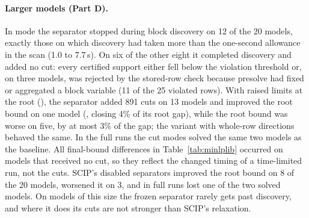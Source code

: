 \paragraph{Larger models (Part D).} In mode  the separator stopped
during block discovery on 12 of the 20 models, exactly those on which
discovery had taken more than the one-second allowance in the scan (1.0 to
7.7\,s). On six of the other eight it completed discovery and added no cut:
every certified support either fell below the violation threshold or, on three
models, was rejected by the stored-row check because presolve had fixed or
aggregated a block variable (11 of the 25 violated rows). With raised limits
at the root (), the separator added 891 cuts on 13 models and
improved the root bound on one model (, closing 4\%
of its root gap), while the root bound was worse on five, by at most 3\% of the
gap; the variant with whole-row directions behaved the same. In the full runs
the cut modes solved the same two models as the baseline. All final-bound
differences in Table~\ref{tab:minlplib} occurred on models that received no
cut, so they reflect the changed timing of a time-limited run, not the cuts.
SCIP's disabled separators improved the root bound on 8 of the 20 models,
worsened it on 3, and in full runs lost one of the two solved models. On
models of this size the frozen separator rarely gets past discovery, and
where it does its cuts are not stronger than SCIP's relaxation.
